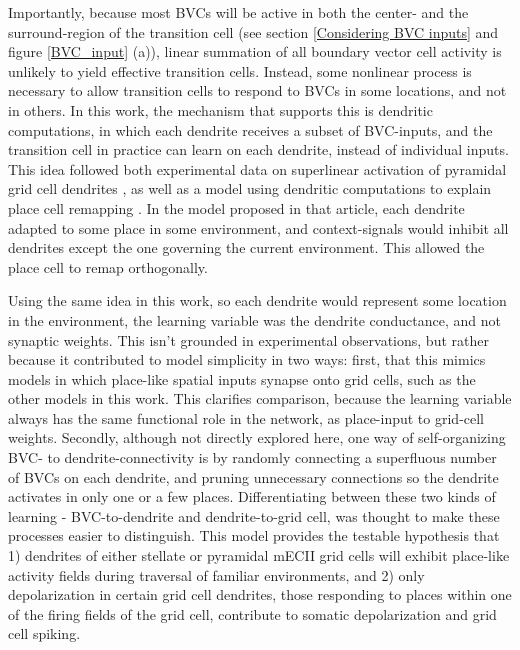 \documentclass{article}
\begin{document}
    Importantly, because most BVCs will be active in both the center- and the surround-region of the transition cell (see section \ref{Considering BVC inputs} and figure \ref{BVC_input} (a)), linear summation of all boundary vector cell activity is unlikely to yield effective transition cells. Instead, some nonlinear process is necessary to allow transition cells to respond to BVCs in some locations, and not in others. In this work, the mechanism that supports this is dendritic computations, in which each dendrite receives a subset of BVC-inputs, and the transition cell in practice can learn on each dendrite, instead of individual inputs. This idea followed both experimental data on superlinear activation of pyramidal grid cell dendrites \parencite{Schmidt-Hieber2017}, as well as a model using dendritic computations to explain place cell remapping \parencite{Alabi2022}. In the model proposed in that article, each dendrite adapted to some place in some environment, and context-signals would inhibit all dendrites except the one governing the current environment. This allowed the place cell to remap orthogonally.

    Using the same idea in this work, so each dendrite would represent some location in the environment, the learning variable was the dendrite conductance, and not synaptic weights. This isn't grounded in experimental observations, but rather because it contributed to model simplicity in two ways: first, that this mimics models in which place-like spatial inputs synapse onto grid cells, such as the other models in this work. This clarifies comparison, because the learning variable always has the same functional role in the network, as place-input to grid-cell weights. Secondly, although not directly explored here, one way of self-organizing BVC- to dendrite-connectivity is by randomly connecting a superfluous number of BVCs on each dendrite, and pruning unnecessary connections so the dendrite activates in only one or a few places. Differentiating between these two kinds of learning - BVC-to-dendrite and dendrite-to-grid cell, was thought to make these processes easier to distinguish. 
    This model provides the testable hypothesis that 1) dendrites of either stellate or pyramidal mECII grid cells will exhibit place-like activity fields during traversal of familiar environments, and 2) only depolarization in certain grid cell dendrites, those responding to places within one of the firing fields of the grid cell, contribute to somatic depolarization and grid cell spiking.
\end{document}
